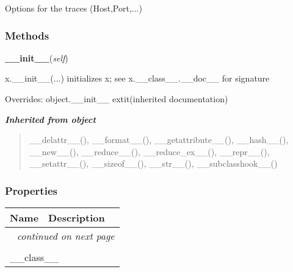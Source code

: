 Options for the traces (Host,Port,...)



  \subsubsection{Methods}

    \vspace{0.5ex}

\hspace{.8\funcindent}\begin{boxedminipage}{\funcwidth}

    \raggedright \textbf{\_\_init\_\_}(\textit{self})

\setlength{\parskip}{2ex}
    x.\_\_init\_\_(...) initializes x; see x.\_\_class\_\_.\_\_doc\_\_ for 
    signature

\setlength{\parskip}{1ex}
      Overrides: object.\_\_init\_\_ 	extit{(inherited documentation)}

    \end{boxedminipage}


\large{\textbf{\textit{Inherited from object}}}

\begin{quote}
\_\_delattr\_\_(), \_\_format\_\_(), \_\_getattribute\_\_(), \_\_hash\_\_(), \_\_new\_\_(), \_\_reduce\_\_(), \_\_reduce\_ex\_\_(), \_\_repr\_\_(), \_\_setattr\_\_(), \_\_sizeof\_\_(), \_\_str\_\_(), \_\_subclasshook\_\_()
\end{quote}


  \subsubsection{Properties}

    \vspace{-1cm}
\hspace{\varindent}\begin{longtable}{|p{\varnamewidth}|p{\vardescrwidth}|l}
\cline{1-2}
\cline{1-2} \centering \textbf{Name} & \centering \textbf{Description}& \\
\cline{1-2}
\endhead\cline{1-2}\multicolumn{3}{r}{\small\textit{continued on next page}}\\\endfoot\cline{1-2}
\endlastfoot\multicolumn{2}{|l|}{\textit{Inherited from object}}\\
\multicolumn{2}{|p{\varwidth}|}{\raggedright \_\_class\_\_}\\
\cline{1-2}
\end{longtable}

